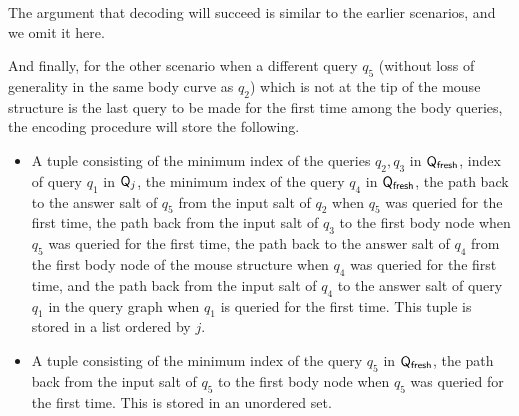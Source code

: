 {The argument that decoding will succeed is similar to the earlier scenarios, and we omit it here.

And finally, for the other scenario when a different query $q_5$ (without loss of generality in the same body curve as $q_2$) which is not at the tip of the mouse structure is the last query to be made for the first time among the body queries, the encoding procedure will store the following.

\begin{itemize}
  \item A tuple consisting of the minimum index of the queries $q_2,q_3$ in $\mathsf{Q}_\textsf{fresh}$, index of query $q_1$ in $\mathsf{Q}_j$, the minimum index of the query $q_4$ in $\mathsf{Q}_\textsf{fresh}$, the path back to the answer salt of $q_5$ from the input salt of $q_2$ when $q_5$ was queried for the first time, the path back from the input salt of $q_3$ to the first body node when $q_5$ was queried for the first time, the path back to the answer salt of $q_4$ from the first body node of the mouse structure when $q_4$ was queried for the first time, and the path back from the input salt of $q_4$ to the answer salt of query $q_1$ in the query graph when $q_1$ is queried for the first time. This tuple is stored in a list ordered by $j$.
  \item A tuple consisting of the minimum index of the query $q_5$ in $\mathsf{Q}_\textsf{fresh}$, the path back from the input salt of $q_5$ to the first body node when $q_5$ was queried for the first time. This is stored in an unordered set.

\end{itemize}}

